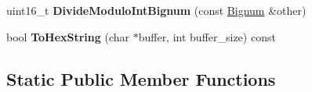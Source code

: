 \begin{DoxyCompactItemize}
\item 
uint16\+\_\+t {\bfseries Divide\+Modulo\+Int\+Bignum} (const \hyperlink{classv8_1_1internal_1_1_bignum}{Bignum} \&other)\hypertarget{classv8_1_1internal_1_1_bignum_a7632eadb7f993623a031ba700c5d4ca1}{}\label{classv8_1_1internal_1_1_bignum_a7632eadb7f993623a031ba700c5d4ca1}

\item 
bool {\bfseries To\+Hex\+String} (char $\ast$buffer, int buffer\+\_\+size) const \hypertarget{classv8_1_1internal_1_1_bignum_a655807878ae634cb6b3935325734fb7d}{}\label{classv8_1_1internal_1_1_bignum_a655807878ae634cb6b3935325734fb7d}

\end{DoxyCompactItemize}
\subsection*{Static Public Member Functions}
